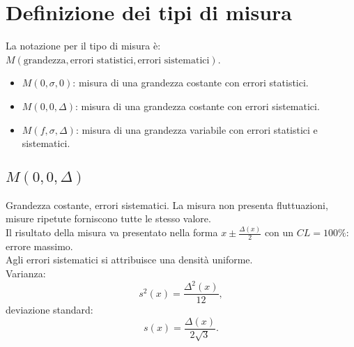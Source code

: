 \section{Definizione dei tipi di misura} %
\label{sec:tipi-di-misura}
La notazione per il tipo di misura è: $M\left(\textrm{grandezza},\textrm{errori statistici},\textrm{errori sistematici} \right) $.
\begin{itemize}
\item $M\left( 0,\sigma,0 \right) $: misura di una grandezza costante con errori statistici.
\item $M\left( 0,0,\Delta \right) $: misura di una grandezza costante con errori sistematici.
\item $M\left( f,\sigma,\Delta \right) $: misura di una grandezza variabile con errori statistici e sistematici.
\end{itemize}

\subsection{$M\left( 0,0,\Delta \right) $} %
\label{subsec:00D}
Grandezza costante, errori sistematici. La misura non presenta fluttuazioni, misure ripetute forniscono tutte le stesso valore.
\\ Il risultato della misura va presentato nella forma $x\pm \frac{\Delta(x)}{2}$ con un $CL=100\%$: errore massimo.
\\ Agli errori sistematici si attribuisce una densità uniforme.\\ Varianza:
\begin{equation}
s^2(x)=\frac{\Delta^2(x)}{12},
\end{equation}
deviazione standard:
\begin{equation}
s(x)=\frac{\Delta (x)}{2\sqrt{3}}.
\end{equation}

